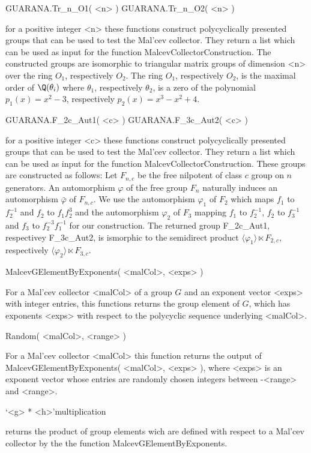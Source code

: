 \> GUARANA.Tr_n_O1( <n> )
\> GUARANA.Tr_n_O2( <n> )

for a positive integer <n> 
these functions construct polycyclically presented groups 
that can be used to test the Mal'cev collector.
They return a list which can be used as input for the function
MalcevCollectorConstruction.
The constructed groups are isomorphic to triangular matrix groups
of dimension <n> over the ring $O_1$, respectively $O_2$.
The ring $O_1$, respectively $O_2$, is the maximal order of 
$\Q(\theta_i)$ where
$\theta_1$, respectively $\theta_2$, is a zero of the polynomial 
$p_1(x) = x^2-3$, respectively 
$p_2(x)=x^3 -x^2 +4$.

\> GUARANA.F_2c_Aut1(  <c> )
\> GUARANA.F_3c_Aut2(  <c> )

for a positive integer <c> 
these functions construct polycyclically presented groups
that can be used to test the Mal'cev collector.
They return a list which can be used as input for the function
MalcevCollectorConstruction.
These groups are constructed as follows:
Let $F_{n,c}$ be the free nilpotent of class $c$ group on $n$ generators.
An automorphism $\varphi$ of the free group $F_n$ naturally induces
an automorphism
$\bar{\varphi}$ of $F_{n,c}$.
We use the automorphism $\varphi_1$ of $F_2$
which maps $f_1$ to $f_2^{-1}$ and $f_2$ to $f_1 f_2^3$
and the automorphism $\varphi_2$ of $F_3$ mapping
$f_1$ to $f_2^{-1}$, $f_2$ to $f_3^{-1}$ and $f_3$ to $f_2^{-3}f_1^{-1}$
for our construction.
The returned group F_2c_Aut1, respectivey F_3c_Aut2, is 
ismorphic to the semidirect product 
 $\langle \varphi_1 \rangle \ltimes F_{2,c}$, respectively
 $\langle \varphi_2 \rangle \ltimes F_{3,c}$.


\> MalcevGElementByExponents( <malCol>, <exps> )

For a Mal'cev collector <malCol> of a group $G$ 
and an exponent vector <exps> with integer
entries, this functions returns the group element of $G$, which 
has exponents <exps> with respect to the polycyclic sequence 
underlying <malCol>.

\> Random( <malCol>, <range> )

For a Mal'cev collector <malCol> this function returns the output of 
MalcevGElementByExponents( <malCol>, <exps> ), where <exps> is an
exponent vector whose entries are randomly chosen integers between 
-<range> and <range>.

\> `<g> * <h>'{multiplication} 

returns the product of group elements wich are defined with respect 
to a Mal'cev collector by the the function MalcevGElementByExponents.

